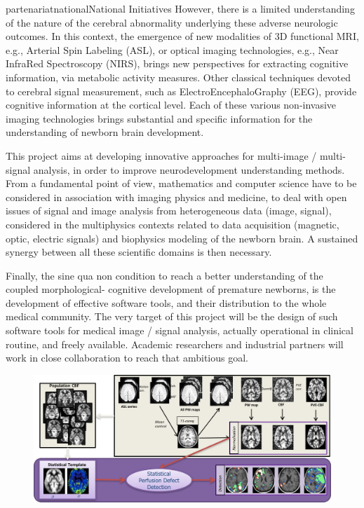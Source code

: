 \documentclass{ra2018}
\begin{document}
\begin{module}{partenariat}{national}{National Initiatives}
        However, there is a limited understanding of the nature of the cerebral
        abnormality underlying these adverse neurologic outcomes.  In this context, the
        emergence of new modalities of 3D functional MRI, e.g., Arterial Spin Labeling
        (ASL), or optical imaging technologies, e.g., Near InfraRed Spectroscopy
        (NIRS), brings new perspectives for extracting cognitive information, via
        metabolic activity measures. Other classical techniques devoted to cerebral
        signal measurement, such as ElectroEncephaloGraphy (EEG), provide cognitive
        information at the cortical level. Each of these various non-invasive imaging
        technologies brings substantial and specific information for the understanding
        of newborn brain development.
        
        This project aims at developing innovative approaches for multi-image /
        multi-signal analysis, in order to improve neurodevelopment understanding
        methods. From a fundamental point of view, mathematics and computer science
        have to be considered in association with imaging physics and medicine, to deal
        with open issues of signal and image analysis from heterogeneous data (image,
        signal), considered in the multiphysics contexts related to data acquisition
        (magnetic, optic, electric signals) and biophysics modeling of the newborn
        brain. A sustained synergy between all these scientific domains is then
        necessary.
        
        Finally, the sine qua non condition to reach a better understanding of the
        coupled morphological- cognitive development of premature newborns, is the
        development of effective software tools, and their distribution to the whole
        medical community. The very target of this project will be the design of such
        software tools for medical image / signal analysis, actually operational in
        clinical routine, and freely available. Academic researchers and industrial
        partners will work in close collaboration to reach that ambitious goal.


        \begin{figure}[htbp]
          \centerline{
            \includegraphics[width=\textwidth]{IMG/ASL_quantification}
          }
        \end{figure}
        

\end{module}
\end{document}
